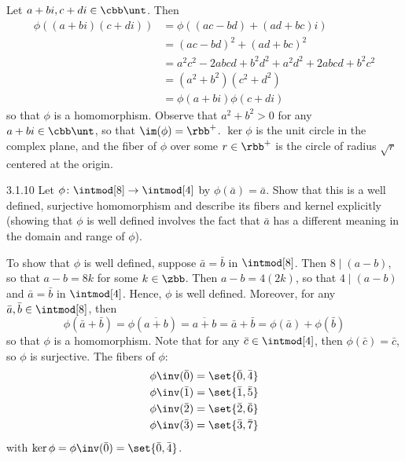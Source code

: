 \begin{sol}
    Let $a + bi, c + di \in \cbb\unt$.
	Then
    \begin{align*}
        \phi((a + bi)(c + di)) & = \phi((ac - bd) + (ad + bc)i) \\
        & = (ac - bd)^2 + (ad + bc)^2 \\
        & = a^2c^2 - 2abcd + b^2d^2 + a^2d^2 + 2abcd + b^2c^2 \\
        & = (a^2 + b^2)(c^2 + d^2) \\
        & = \phi(a + bi)\phi(c + di)
    \end{align*}
    so that $\phi$ is a homomorphism.
	Observe that $a^2 + b^2 > 0$ for any $a + bi \in \cbb\unt$, so that $\im(\phi) = \rbb^+$. $\ker\phi$ is the unit circle in the complex plane, and the fiber of $\phi$ over some $r \in \rbb^+$ is the circle of radius $\sqrt r$ centered at the origin.
\end{sol}

\begin{exercise}{3.1.10}
    Let $\phi \colon \intmod[8] \to \intmod[4]$ by $\phi(\bar  a) = \bar  a$.
	Show that this is a well defined, surjective homomorphism and describe its fibers and kernel explicitly (showing that $\phi$ is well defined involves the fact that $\bar  a$ has a different meaning in the domain and range of $\phi$).
\end{exercise}

\begin{sol}
    To show that $\phi$ is well defined, suppose $\bar a = \bar b$ in $\intmod[8]$.
	Then $8 \mid (a - b)$, so that $a - b = 8k$ for some $k \in \zbb$.
	Then $a - b = 4(2k)$, so that $4 \mid (a - b)$ and $\bar a = \bar b$ in $\intmod[4]$.
	Hence, $\phi$ is well defined.
	Moreover, for any $\bar a, \bar b \in \intmod[8]$, then
    \[
    	\phi(\bar a + \bar b) = \phi(\overline{a + b}) = \overline{a + b} = \bar a + \bar b = \phi(\bar a) + \phi(\bar b)
    \]
    so that $\phi$ is a homomorphism.
	Note that for any $\bar c \in \intmod[4]$, then $\phi(\bar c) = \bar c$, so $\phi$ is surjective.
	The fibers of $\phi$:
    \begin{align*}
        \phi\inv(\bar 0) & = \set{\bar 0, \bar 4} \\
        \phi\inv(\bar 1) & = \set{\bar 1, \bar 5} \\
        \phi\inv(\bar 2) & = \set{\bar 2, \bar 6} \\
        \phi\inv(\bar 3) & = \set{\bar 3, \bar 7}
    \end{align*}
    with $\ker\phi = \phi\inv(\bar 0) = \set{\bar 0, \bar 4}$.
\end{sol}

